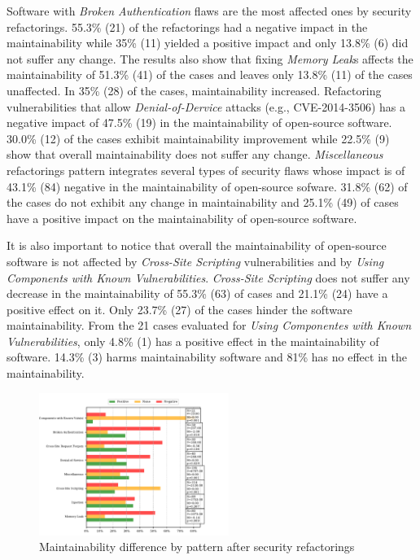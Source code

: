 \documentclass[10pt,conference]{IEEEtran}
\begin{document}
{Software with \emph{Broken Authentication} flaws are the most affected ones by security
refactorings. 55.3\% (21) of the refactorings had a negative impact in the maintainability
while 35\% (11) yielded a positive impact and only 13.8\% (6) did not suffer any
change. The results also show that fixing \emph{Memory Leak}s affects the maintainability
of 51.3\% (41) of the cases and leaves only 13.8\% (11) of the cases unaffected.
In 35\% (28) of the cases, maintainability increased. Refactoring vulnerabilities
that allow \emph{Denial-of-Dervice} attacks (e.g., CVE-2014-3506) has a negative impact
of 47.5\% (19) in the maintainability of open-source software. 30.0\% (12) of
the cases exhibit maintainability improvement while 22.5\% (9) show that overall
maintainability does not suffer any change. \emph{Miscellaneous} refactorings pattern
integrates several types of security flaws whose impact is of 43.1\% (84) negative
in the maintainability of open-source sofware. 31.8\% (62) of the cases do not
exhibit any change in maintainability and 25.1\% (49) of cases have a positive
impact on the maintainability of open-source software.

It is also important to notice that overall the maintainability of open-source
software is not affected by \emph{Cross-Site Scripting} vulnerabilities and by \emph{Using
Components with Known Vulnerabilities}. \emph{Cross-Site Scripting} does not suffer any
decrease in the maintainability of 55.3\% (63) of cases and 21.1\% (24) have a
positive effect on it. Only 23.7\% (27) of the cases hinder the software
maintainability. From the 21 cases evaluated for \emph{Using Componentes with Known
Vulnerabilities}, only 4.8\% (1) has a positive effect in the maintainability
of software. 14.3\% (3) harms maintainability software and 81\% has no effect
in the maintainability.

\begin{figure}[h]
 	\centering
 	\includegraphics[width=0.55\textwidth]{figures/category.pdf}
 	\caption{Maintainability difference by pattern after security refactorings}
	\label{fig:pat}
\end{figure}

}
\end{document}
